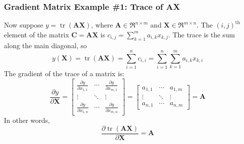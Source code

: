 \documentclass{beamer}
\DeclareMathOperator{\tr}{tr}
\begin{document}
\begin{frame}
  \frametitle{Gradient Matrix Example \#1: Trace of AX}

  Now suppose $y=\tr(\mathbf{A}\mathbf{X})$, where
  $\mathbf{A}\in\Re^{n\times m}$ and $\mathbf{X}\in\Re^{m\times n}$.
  The $(i,j)^{\text{th}}$ element of the matrix $\mathbf{C}=\mathbf{A}\mathbf{X}$
  is $c_{i,j}=\sum_{k=1}^ma_{i,k}x_{k,j}$.  The trace is the sum along the main
  diagonal, so
  \begin{displaymath}
    y(\mathbf{X}) = \tr(\mathbf{A}\mathbf{X})= \sum_{i=1}^nc_{i,i}=
    \sum_{i=1}^n\sum_{k=1}^m a_{i,k}x_{k,i}
  \end{displaymath}
  The gradient of the trace of a matrix is:
  \begin{displaymath}
    \frac{\partial y}{\partial\mathbf{X}}=
    \left[\begin{array}{ccc}
        \frac{\partial y}{\partial x_{1,1}}&\cdots&\frac{\partial y}{\partial x_{m,1}}\\
        \vdots&\ddots&\vdots\\
        \frac{\partial y}{\partial x_{1,n}}&\cdots&\frac{\partial y}{\partial x_{m,n}}
      \end{array}\right]
    =
    \left[\begin{array}{ccc}
        a_{1,1}&\cdots&a_{1,m}\\
        \vdots&\ddots&\vdots\\
        a_{n,1}&\cdots&a_{n,m}
      \end{array}\right]=\mathbf{A}
  \end{displaymath}
  In other words,
  \begin{displaymath}
    \frac{\partial\tr(\mathbf{A}\mathbf{X})}{\partial\mathbf{X}} =\mathbf{A}
  \end{displaymath}
\end{frame}
\end{document}
